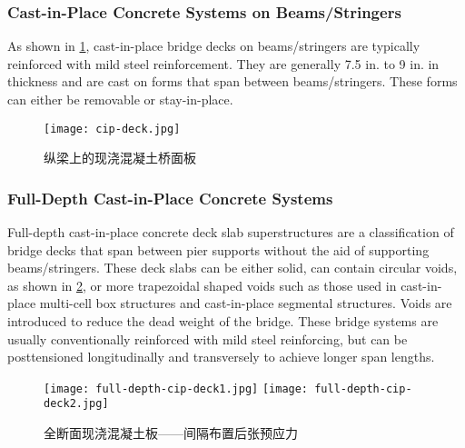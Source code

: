 \subsubsection{Cast-in-Place Concrete Systems on Beams/Stringers}

As shown in \cref{fig:cip-deck}, cast-in-place bridge decks on beams/stringers are typically reinforced with mild steel reinforcement. They are generally 7.5 in. to 9 in. in thickness and are cast on forms that span between beams/stringers. These forms can either be removable or stay-in-place.

\begin{figure}
  \texttt{[image: cip-deck.jpg]}
  \caption{纵梁上的现浇混凝土桥面板}
  \label{fig:cip-deck}
\end{figure}


\subsubsection{Full-Depth Cast-in-Place Concrete Systems}

Full-depth cast-in-place concrete deck slab superstructures are a classification of bridge decks that span between pier supports without the aid of supporting beams/stringers. These deck slabs can be either solid, can contain circular voids, as shown in \cref{fig:full-depth-cip-deck}, or more trapezoidal shaped voids such as those used in cast-in-place multi-cell box structures and cast-in-place segmental structures. Voids are introduced to reduce the dead weight of the bridge. These bridge systems are usually conventionally reinforced with mild steel reinforcing, but can be posttensioned longitudinally and transversely to achieve longer span lengths.

\begin{figure}
  \texttt{[image: full-depth-cip-deck1.jpg]}\hfill
  \texttt{[image: full-depth-cip-deck2.jpg]}
  \caption{全断面现浇混凝土板——间隔布置后张预应力}
  \label{fig:full-depth-cip-deck}
\end{figure}

